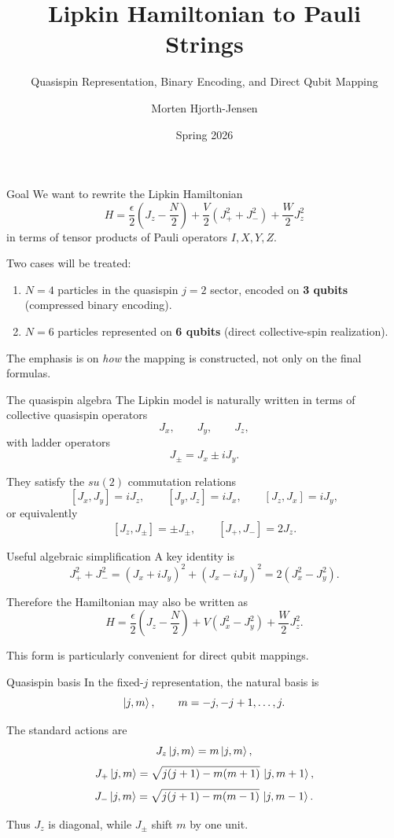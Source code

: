 \documentclass[aspectratio=169]{beamer}
\title{Lipkin Hamiltonian to Pauli Strings}
\subtitle{Quasispin Representation, Binary Encoding, and Direct Qubit Mapping}
\author{Morten Hjorth-Jensen}
\date{Spring 2026}
\begin{document}
\frame{\titlepage}

\begin{frame}{Goal}
We want to rewrite the Lipkin Hamiltonian
\[
H = \frac{\epsilon}{2}\left(J_z-\frac{N}{2}\right)
+ \frac{V}{2}\left(J_+^2+J_-^2\right)
+ \frac{W}{2}J_z^2
\]
in terms of tensor products of Pauli operators \(I,X,Y,Z\).

\medskip

Two cases will be treated:
\begin{enumerate}
\item \(N=4\) particles in the quasispin \(j=2\) sector, encoded on \textbf{3 qubits} (compressed binary encoding).
\item \(N=6\) particles represented on \textbf{6 qubits} (direct collective-spin realization).
\end{enumerate}

The emphasis is on \emph{how} the mapping is constructed, not only on the final formulas.
\end{frame}

\begin{frame}{The quasispin algebra}
The Lipkin model is naturally written in terms of collective quasispin operators
\[
J_x,\qquad J_y,\qquad J_z,
\]
with ladder operators
\[
J_\pm = J_x \pm iJ_y.
\]

They satisfy the \(su(2)\) commutation relations
\[
[J_x,J_y]=iJ_z,\qquad [J_y,J_z]=iJ_x,\qquad [J_z,J_x]=iJ_y,
\]
or equivalently
\[
[J_z,J_\pm]=\pm J_\pm,\qquad [J_+,J_-]=2J_z.
\]
\end{frame}

\begin{frame}{Useful algebraic simplification}
A key identity is
\[
J_+^2 + J_-^2
=
(J_x+iJ_y)^2 + (J_x-iJ_y)^2
=
2(J_x^2-J_y^2).
\]

Therefore the Hamiltonian may also be written as
\[
H
=
\frac{\epsilon}{2}\left(J_z-\frac{N}{2}\right)
+
V\left(J_x^2-J_y^2\right)
+
\frac{W}{2}J_z^2.
\]

This form is particularly convenient for direct qubit mappings.
\end{frame}

\begin{frame}{Quasispin basis}
In the fixed-\(j\) representation, the natural basis is
\[
\ket{j,m},\qquad m=-j,-j+1,\dots,j.
\]

The standard actions are
\[
J_z\ket{j,m}=m\ket{j,m},
\]
\[
J_+\ket{j,m}
=
\sqrt{j(j+1)-m(m+1)}\,\ket{j,m+1},
\]
\[
J_-\ket{j,m}
=
\sqrt{j(j+1)-m(m-1)}\,\ket{j,m-1}.
\]

Thus \(J_z\) is diagonal, while \(J_\pm\) shift \(m\) by one unit.
\end{frame}
\end{document}
